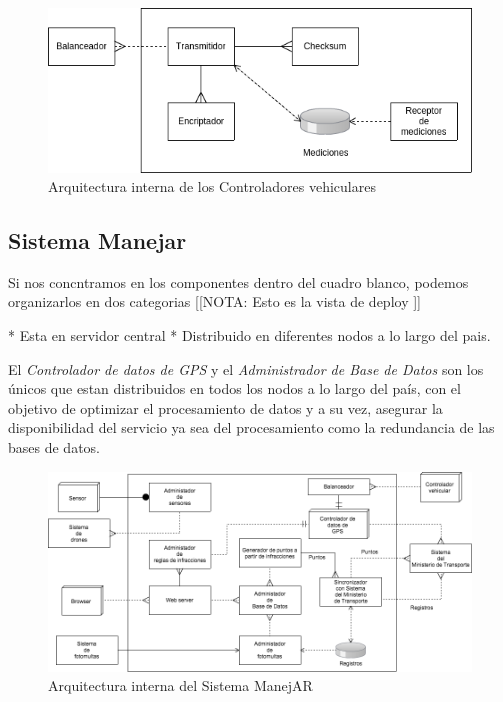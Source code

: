 \begin{figure}
\centerline{\includegraphics[width=1\textwidth]{./imagenes/arquitectura_tp2/controlador_vehicular.png}}
\caption{Arquitectura interna de los Controladores vehiculares}
\end{figure}


\subsection{Sistema Manejar}

Si nos concntramos en los componentes dentro del cuadro blanco, podemos 
organizarlos en dos categorias [[NOTA: Esto es la vista de deploy ]]

* Esta en servidor central
* Distribuido en diferentes nodos a lo largo del pais.

El \textit{Controlador de datos de GPS} y el \textit{Administrador de Base de Datos} 
son los únicos que estan distribuidos en todos los nodos a lo largo del país, 
con el objetivo de optimizar el procesamiento de datos y a su vez, asegurar la 
disponibilidad del servicio ya sea del procesamiento como la redundancia de las bases de datos.


\begin{figure}
\centerline{\includegraphics[width=1\textwidth]{./imagenes/arquitectura_tp2/manejar.png}}
\caption{Arquitectura interna del Sistema ManejAR}
\end{figure}


